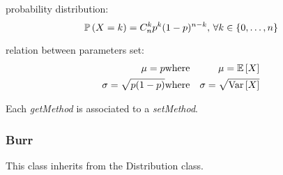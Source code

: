 \begin{description}
\begin{description}
\end{description}

\item[Details:]  \rule{0pt}{1em}
\begin{description}
\item probability distribution:
\begin{equation}
{\mathbb P}\left( X=k \right)  = C_n^k p^k (1-p)^{n-k}, \, \forall k \in \{0, \hdots, n\}
\end{equation}
\item relation between parameters set:
\begin{eqnarray*}
\mu  =   p                                              & \mbox{where}& \mu ={\mathbb E}\left[ X \right] \\
\sigma  = \sqrt{p(1-p)}  & \mbox{where}& \sigma =\sqrt{{\rm Var}\left[ X \right] }
\end{eqnarray*}

\end{description}
\bigskip

\item[Links:]  \rule{0pt}{1em}
\end{description}


Each  \textit{getMethod}  is associated to a \textit{setMethod}.




\newpage
\subsubsection{Burr}

This class inherits from the Distribution class.

